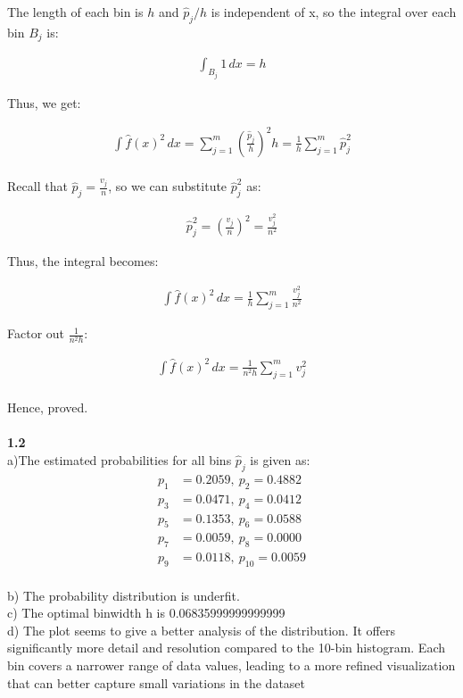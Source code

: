 The length of each bin is  $h$ and $ \hat{p}_{j}/h $ is independent of x, so the integral over each bin $B_j$  is:

\begin{align}
\int_{B_j} 1 \, dx = h
\end{align}

Thus, we get:

\begin{align}
\int \hat{f}(x)^2 \, dx = \sum_{j=1}^{m} \left( \frac{\hat{p}_j}{h} \right)^2 h = \frac{1}{h} \sum_{j=1}^{m} \hat{p}_j^2
\end{align}
\\

Recall that \( \hat{p}_j = \frac{v_j}{n} \), so we can substitute \( \hat{p}_j^2 \) as:

\begin{align}
\hat{p}_j^2 = \left( \frac{v_j}{n} \right)^2 = \frac{v_j^2}{n^2}
\end{align}

Thus, the integral becomes:

\begin{align}
\int \hat{f}(x)^2 \, dx = \frac{1}{h} \sum_{j=1}^{m} \frac{v_j^2}{n^2}
\end{align}

Factor out \( \frac{1}{n^2 h} \):

\begin{align}
\int \hat{f}(x)^2 \, dx = \frac{1}{n^2 h} \sum_{j=1}^{m} v_j^2
\end{align}
\\
Hence, proved.
\\
\\
\textbf{1.2}
\\
a)The estimated probabilities for all bins $\hat{p}_j$ is given as:
\begin{align*}
p_1 & = 0.2059, \:
p_2 = 0.4882 \\
p_3 & = 0.0471, \:
p_4 = 0.0412 \\
p_5 & = 0.1353, \:
p_6  = 0.0588 \\
p_7 & = 0.0059, \:
p_8 = 0.0000 \\
p_9 & = 0.0118, \:
p_{10} = 0.0059
\end{align*}
\\
b) The probability distribution is underfit. \\
c) The optimal binwidth h is 0.06835999999999999
\\
d) The plot seems to give a better analysis of the distribution. It  offers significantly more detail and resolution compared to the 10-bin histogram. Each bin covers a narrower range of data values, leading to a more refined visualization that can better capture small variations in the dataset
